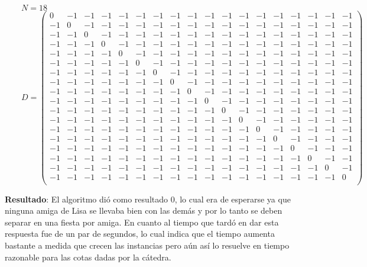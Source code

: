 \begin{flushleft}
$\qquad N = 18$\\[10pt]
$\qquad D = \left( \begin{smallmatrix}
0 & -1 & -1 & -1 & -1 & -1 & -1 & -1 & -1 & -1 & -1 & -1 & -1 & -1 & -1 & -1 & -1 & -1 \\
-1 & 0 & -1 & -1 & -1 & -1 & -1 & -1 & -1 & -1 & -1 & -1 & -1 & -1 & -1 & -1 & -1 & -1 \\
-1 & -1 & 0 & -1 & -1 & -1 & -1 & -1 & -1 & -1 & -1 & -1 & -1 & -1 & -1 & -1 & -1 & -1 \\
-1 & -1 & -1 & 0 & -1 & -1 & -1 & -1 & -1 & -1 & -1 & -1 & -1 & -1 & -1 & -1 & -1 & -1 \\
-1 & -1 & -1 & -1 & 0 & -1 & -1 & -1 & -1 & -1 & -1 & -1 & -1 & -1 & -1 & -1 & -1 & -1 \\
-1 & -1 & -1 & -1 & -1 & 0 & -1 & -1 & -1 & -1 & -1 & -1 & -1 & -1 & -1 & -1 & -1 & -1 \\
-1 & -1 & -1 & -1 & -1 & -1 & 0 & -1 & -1 & -1 & -1 & -1 & -1 & -1 & -1 & -1 & -1 & -1 \\
-1 & -1 & -1 & -1 & -1 & -1 & -1 & 0 & -1 & -1 & -1 & -1 & -1 & -1 & -1 & -1 & -1 & -1 \\
-1 & -1 & -1 & -1 & -1 & -1 & -1 & -1 & 0 & -1 & -1 & -1 & -1 & -1 & -1 & -1 & -1 & -1 \\
-1 & -1 & -1 & -1 & -1 & -1 & -1 & -1 & -1 & 0 & -1 & -1 & -1 & -1 & -1 & -1 & -1 & -1 \\
-1 & -1 & -1 & -1 & -1 & -1 & -1 & -1 & -1 & -1 & 0 & -1 & -1 & -1 & -1 & -1 & -1 & -1 \\
-1 & -1 & -1 & -1 & -1 & -1 & -1 & -1 & -1 & -1 & -1 & 0 & -1 & -1 & -1 & -1 & -1 & -1 \\
-1 & -1 & -1 & -1 & -1 & -1 & -1 & -1 & -1 & -1 & -1 & -1 & 0 & -1 & -1 & -1 & -1 & -1 \\
-1 & -1 & -1 & -1 & -1 & -1 & -1 & -1 & -1 & -1 & -1 & -1 & -1 & 0 & -1 & -1 & -1 & -1 \\
-1 & -1 & -1 & -1 & -1 & -1 & -1 & -1 & -1 & -1 & -1 & -1 & -1 & -1 & 0 & -1 & -1 & -1 \\
-1 & -1 & -1 & -1 & -1 & -1 & -1 & -1 & -1 & -1 & -1 & -1 & -1 & -1 & -1 & 0 & -1 & -1 \\
-1 & -1 & -1 & -1 & -1 & -1 & -1 & -1 & -1 & -1 & -1 & -1 & -1 & -1 & -1 & -1 & 0 & -1 \\
-1 & -1 & -1 & -1 & -1 & -1 & -1 & -1 & -1 & -1 & -1 & -1 & -1 & -1 & -1 & -1 & -1 & 0 \\
\end{smallmatrix} \right)$
\end{flushleft}

\textbf{Resultado}: El algoritmo dió como resultado 0, lo cual era de esperarse ya que ninguna amiga de Lisa 
se llevaba bien con las demás y por lo tanto se deben separar en una fiesta por amiga. En cuanto al tiempo que 
tardó en dar esta respuesta fue de un par de segundos, lo cual indica que el tiempo aumenta bastante a medida 
que crecen las instancias pero aún así lo resuelve en tiempo razonable para las cotas dadas por la cátedra.
